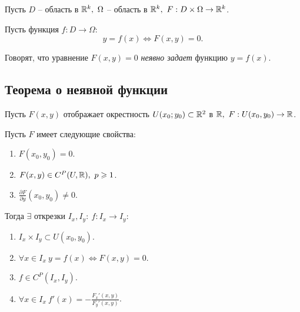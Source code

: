 \begin{definition}
    Пусть $D$ -- область в $\mathbb{R}^k, \ \Omega$ -- область в $\mathbb{R}^k, \ F: D \times \Omega \rightarrow \mathbb{R}^k $.

    Пусть функция $f:D \rightarrow\Omega:$
    \[
        y = f(x) \iff F(x,y) = 0.
    \]

    Говорят, что уравнение $F(x,y) = 0$ \emph{неявно задает} функцию $y = f(x)$.
\end{definition}

\subsection{Теорема о неявной функции}

\begin{theorem}\label{theorem:1}
    Пусть $ F(x,y) $ отображает окрестность $ U(x_0;y_0) \subset \mathbb{R}^2 $ в $ \R, \ F:U(x_0,y_0)\rightarrow\R $.

    Пусть $ F $ имеет следующие свойства:
    \begin{enumerate}
        \item $ F(x_0,y_0) = 0 $.
        \item $ F(x,y) \in C^P(U,\mathbb{R}), \ p \geqslant 1 $.
        \item $ \frac{\partial F}{\partial y}(x_0,y_0)\ne 0 $.
    \end{enumerate}

    Тогда $ \exists $ открезки $ I_x,I_y: \ f:I_x \rightarrow I_y $:
    \begin{enumerate}
        \item $ I_x \times I_y \subset U(x_0,y_0) $.
        \item $ \forall x \in I_x \ y = f(x) \iff F(x,y) = 0 $.
        \item $ f \in C^P(I_x,I_y) $.
        \item $ \forall x \in I_x \ f'(x) = -\frac{F_x'(x,y)}{F_y'(x,y)} $.
    \end{enumerate}
\end{theorem}